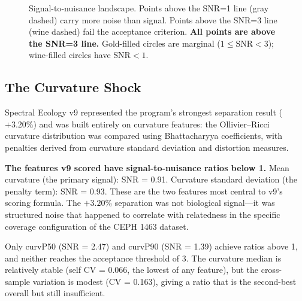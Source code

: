 \documentclass{../yalumba}
\begin{document}
\begin{figure}[htbp]
\caption{Signal-to-nuisance landscape.  Points above the SNR=1 line
(gray dashed) carry more noise than signal.  Points above the SNR=3
line (wine dashed) fail the acceptance criterion.  \textbf{All points
are above the SNR=3 line.}  Gold-filled circles are marginal
($1 \leq \text{SNR} < 3$); wine-filled circles have $\text{SNR} < 1$.}
\label{fig:snr-landscape}
\end{figure}

\subsection{The Curvature Shock}
\label{sec:curvature-shock}

Spectral Ecology v9 represented the program's strongest separation
result ($+3.20\%$) and was built entirely on curvature features: the
Ollivier--Ricci curvature distribution was compared using Bhattacharyya
coefficients, with penalties derived from curvature standard deviation
and distortion measures.

\begin{limitation}
\textbf{The features v9 scored have signal-to-nuisance ratios below 1.}
Mean curvature (the primary signal): SNR = 0.91.
Curvature standard deviation (the penalty term): SNR = 0.93.
These are the two features most central to v9's scoring formula.  The
$+3.20\%$ separation was not biological signal---it was structured noise
that happened to correlate with relatedness in the specific coverage
configuration of the CEPH 1463 dataset.
\end{limitation}

Only curvP50 (SNR = 2.47) and curvP90 (SNR = 1.39) achieve ratios above
1, and neither reaches the acceptance threshold of 3.  The curvature
median is relatively stable (self CV = 0.066, the lowest of any feature),
but the cross-sample variation is modest (CV = 0.163), giving a ratio
that is the second-best overall but still insufficient.
\end{document}

